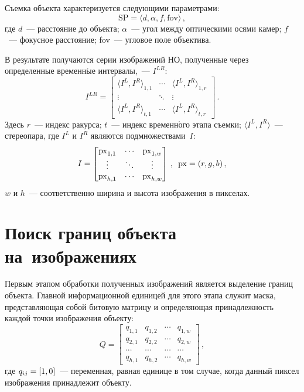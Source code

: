 \begin{multicols}{2}
  Съемка объекта характеризуется следующими параметрами:
  $$
  \mathrm{SP}=\langle d, \alpha, f, \mathrm{fov}\rangle\,,
  $$
где $d$~--- расстояние до объекта;
$\alpha$~--- угол между оптическими осями камер;
$f$~--- фокусное расстояние;
fov~--- угловое поле объектива.
  
  В результате получаются серии изображений НО, полученные 
через определенные временн$\acute{\mbox{ы}}$е интервалы,~--- $I^{LR}$:
  $$
  I^{LR} = \begin{bmatrix}
  \langle I^L, I^R\rangle_{1,1} & \cdots & \langle I^L, I^R\rangle_{1,r}\\
  \vdots & \ddots & \vdots\\
  \langle I^L, I^R\rangle_{t,1} & \cdots & \langle I^L, I^R\rangle_{t,r}
  \end{bmatrix}\,.
  $$
Здесь $r$~--- индекс ракурса;
$t$~--- индекс временн$\acute{\mbox{о}}$го этапа съемки;
$\langle I^L, I^R\rangle$~--- стереопара, где $I^L$ и $I^R$ являются 
подмножествами~$I$:
$$
I=\begin{bmatrix}
\mathrm{px}_{1,1} & \cdots & \mathrm{px}_{1,w}\\
\vdots & \ddots & \vdots\\
\mathrm{px}_{h,1} &\cdots & \mathrm{px}_{h,w}
\end{bmatrix}\,,\enskip  \mathrm{px} = (r, g, b)\,,
$$
$w$ и $h$~--- соответственно ширина и высота изоб\-ра\-же\-ния в пикселах.



  
\section{Поиск границ объекта на~изображениях}

  Первым этапом обработки полученных изображений является выделение 
границ объекта. Главной информационной единицей для этого этапа служит 
маска, представляющая собой битовую матрицу и определяющая 
принадлежность каждой точки изоб\-ра\-же\-ния объекту:
  $$
  Q=\begin{bmatrix}
  q_{1,1} & q_{1,2} & \cdots & q_{1,w}\\
  q_{2,1} & q_{2,2} & \cdots & q_{2,w}\\
  \cdots & \cdots & \cdots & \cdots\\
  q_{h,1} & q_{h,2} & \cdots & q_{h,w}
  \end{bmatrix}\,,
  $$
где $q_{ij}\hm = [1, 0]$~--- переменная, равная единице в том случае, когда 
данный пиксел изображения принадлежит объекту.


\end{multicols}
